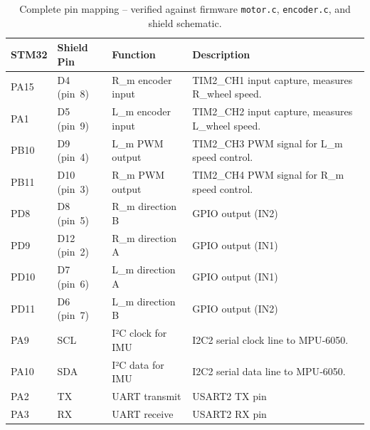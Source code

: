 \documentclass[12pt,a4paper]{article}
\begin{document}
	\begin{table}[htbp]
		\centering
		\caption{Complete pin mapping -- verified against firmware \texttt{motor.c}, \texttt{encoder.c}, and shield schematic.}
		\label{tab:pins}
		\begin{tabular}{@{}llll@{}}
			\toprule
			\textbf{STM32} & \textbf{Shield Pin} & \textbf{Function} & \textbf{Description} \\
			\midrule
			PA15  & D4 (pin~8)  & R\_m encoder input & TIM2\_CH1 input capture, measures R\_wheel speed. \\
			PA1  & D5 (pin~9)  & L\_m encoder input  & TIM2\_CH2 input capture, measures L\_wheel speed. \\
			PB10 & D9 (pin~4)  & L\_m PWM output       & TIM2\_CH3 PWM signal for L\_m speed control. \\
			PB11 & D10 (pin~3) & R\_m PWM output      & TIM2\_CH4 PWM signal for R\_m speed control. \\
			PD8  & D8 (pin~5)  & R\_m direction B     & GPIO output (IN2) \\
			PD9  & D12 (pin~2) & R\_m direction A     & GPIO output (IN1) \\
			PD10 & D7 (pin~6)  & L\_m direction A      & GPIO output (IN1)\\
			PD11 & D6 (pin~7)  & L\_m direction B      & GPIO output (IN2)\\
			PA9  & SCL & I²C clock for IMU          & I2C2 serial clock line to MPU‑6050. \\
			PA10 & SDA & I²C data for IMU           & I2C2 serial data line to MPU‑6050. \\
			PA2  & TX & UART transmit    & USART2 TX pin\\
			PA3  & RX  & UART receive     & USART2 RX pin\\
			\bottomrule
		\end{tabular}
		\vspace{0.5em}
	\end{table}
	
\end{document}
